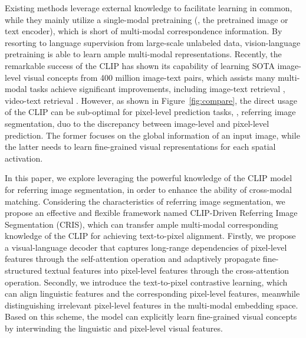 \documentclass[10pt,twocolumn,letterpaper]{article}
\begin{document}
Existing methods \cite{chen2019referring,shi2018key,ye2019cross,huang2020referring,huilinguistic} leverage external knowledge to facilitate learning in common, while they mainly utilize a single-modal pretraining (\eg, the pretrained image or text encoder), which is short of multi-modal correspondence information.
By resorting to language supervision from large-scale unlabeled data, vision-language pretraining \cite{radford2021learning,wang2021simvlm,miech2020end} is able to learn ample multi-modal representations.
Recently, the remarkable success of the CLIP \cite{radford2021learning} has shown its capability of learning SOTA image-level visual concepts from 400 million image-text pairs,
which assists many multi-modal tasks achieve significant improvements, including image-text retrieval \cite{radford2021learning}, video-text retrieval \cite{luo2021clip4clip,fang2021clip2video}.
However, as shown in Figure~\ref{fig:compare}, the direct usage of the CLIP can be sub-optimal for pixel-level prediction tasks, \eg, referring image segmentation, duo to the discrepancy between image-level and pixel-level prediction.
The former focuses on the global information of an input image, while the latter needs to learn fine-grained visual representations for each spatial activation.

In this paper, we explore leveraging the powerful knowledge of the CLIP model for referring image segmentation, in order to enhance the ability of cross-modal matching.
Considering the characteristics of referring image segmentation, we propose an effective and flexible framework named CLIP-Driven Referring Image Segmentation (CRIS), which can transfer ample multi-modal corresponding knowledge of the CLIP for achieving text-to-pixel alignment.
Firstly, we propose a visual-language decoder that captures long-range dependencies of pixel-level features through the self-attention operation and adaptively propagate fine-structured textual features into pixel-level features through the cross-attention operation.
Secondly, we introduce the text-to-pixel contrastive learning,
which can align linguistic features and the corresponding pixel-level features, meanwhile distinguishing irrelevant pixel-level features in the multi-modal embedding space.
Based on this scheme, the model can explicitly learn fine-grained visual concepts by interwinding the linguistic and pixel-level visual features.
\end{document}

